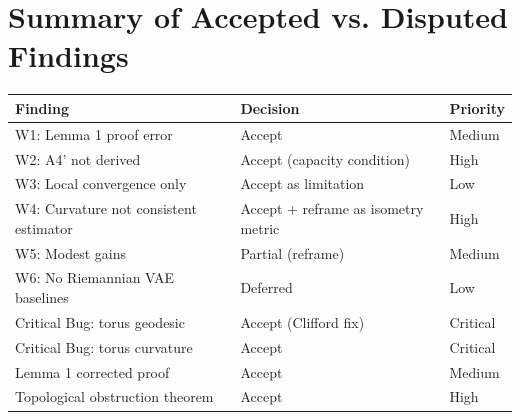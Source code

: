 \documentclass{article}
\begin{document}
\section{Summary of Accepted vs. Disputed Findings}

\begin{tabular}{lll}
\hline
Finding & Decision & Priority \\
\hline
W1: Lemma 1 proof error & Accept & Medium \\
W2: A4' not derived & Accept (capacity condition) & High \\
W3: Local convergence only & Accept as limitation & Low \\
W4: Curvature not consistent estimator & Accept + reframe as isometry metric & High \\
W5: Modest gains & Partial (reframe) & Medium \\
W6: No Riemannian VAE baselines & Deferred & Low \\
Critical Bug: torus geodesic & Accept (Clifford fix) & Critical \\
Critical Bug: torus curvature & Accept & Critical \\
Lemma 1 corrected proof & Accept & Medium \\
Topological obstruction theorem & Accept & High \\
\hline
\end{tabular}
\end{document}
